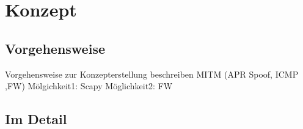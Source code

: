 \chapter{Konzept}
\section{Vorgehensweise}
    Vorgehensweise zur Konzepterstellung beschreiben
    MITM (APR Spoof, ICMP ,FW)
    Mölgichkeit1: Scapy
    Möglichkeit2: FW

\section{Im Detail}